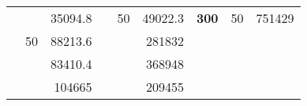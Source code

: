 \begin{table}[H]
\begin{tabular}{|ccrccrccr}
\rowcolor[HTML]{DDFDFF} 
\multicolumn{1}{|c|}{\cellcolor[HTML]{FFFFC7}}                                & \multicolumn{1}{c|}{\cellcolor[HTML]{DDFDFF}}                      & \multicolumn{1}{r|}{\cellcolor[HTML]{DAE8FC}35094.8}   & \multicolumn{1}{c|}{\cellcolor[HTML]{FFFFC7}}                                & \multicolumn{1}{c|}{\multirow{-10}{*}{\cellcolor[HTML]{DDFDFF}50}}  & \multicolumn{1}{r|}{\cellcolor[HTML]{DDFDFF}49022.3}   & \multicolumn{1}{c|}{\multirow{-19}{*}{\cellcolor[HTML]{FFFFC7}\textbf{300}}} & \multicolumn{1}{c|}{\multirow{-10}{*}{\cellcolor[HTML]{DDFDFF}50}} & \multicolumn{1}{r|}{\cellcolor[HTML]{DDFDFF}751429}    \\ \cline{3-3} \cline{5-9} 
\multicolumn{1}{|c|}{\cellcolor[HTML]{FFFFC7}}                                & \multicolumn{1}{c|}{\multirow{-10}{*}{\cellcolor[HTML]{DDFDFF}50}} & \multicolumn{1}{r|}{\cellcolor[HTML]{DDFDFF}88213.6}   & \multicolumn{1}{c|}{\cellcolor[HTML]{FFFFC7}}                                & \multicolumn{1}{c|}{\cellcolor[HTML]{DAE8FC}}                       & \multicolumn{1}{r|}{\cellcolor[HTML]{DAE8FC}281832}    &                                                                              &                                                                    &                                                        \\ \cline{2-3} \cline{6-6}
\multicolumn{1}{|c|}{\cellcolor[HTML]{FFFFC7}}                                & \multicolumn{1}{c|}{\cellcolor[HTML]{DAE8FC}}                      & \multicolumn{1}{r|}{\cellcolor[HTML]{DAE8FC}83410.4}   & \multicolumn{1}{c|}{\cellcolor[HTML]{FFFFC7}}                                & \multicolumn{1}{c|}{\cellcolor[HTML]{DAE8FC}}                       & \multicolumn{1}{r|}{\cellcolor[HTML]{DDFDFF}368948}    &                                                                              &                                                                    &                                                        \\ \cline{3-3} \cline{6-6}
\multicolumn{1}{|c|}{\cellcolor[HTML]{FFFFC7}}                                & \multicolumn{1}{c|}{\cellcolor[HTML]{DAE8FC}}                      & \multicolumn{1}{r|}{\cellcolor[HTML]{DDFDFF}104665}    & \multicolumn{1}{c|}{\cellcolor[HTML]{FFFFC7}}                                & \multicolumn{1}{c|}{\cellcolor[HTML]{DAE8FC}}                       & \multicolumn{1}{r|}{\cellcolor[HTML]{DAE8FC}209455}    &                                                                              &                                                                    &                                                        \\ \cline{3-3} \cline{6-6}

\end{tabular}
\end{table}
